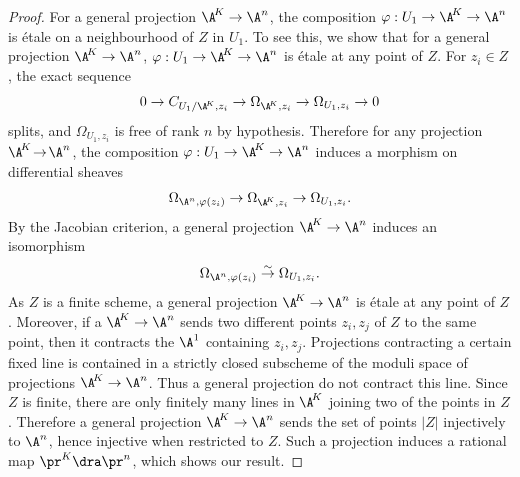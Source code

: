 \begin{proof}
For a general projection $\A^{\!K}\to \A^n$, the composition $\varphi: U_1\to \A^{\!K}\to \A^n$ is étale on a neighbourhood of $Z$ in $U_1$. To see this, we show that for a general projection $\A^{\!K}\to \A^n$, $\varphi: U_1\to \A^{\!K}\to \A^n$ is étale at any point of $Z$. For $z_i\in Z$, the exact sequence
\[
0 \to C_{U_1/\A^{\!K},z_i} \to \Omega_{\A^{\!K}, z_i} \to \Omega_{U_1,z_i}\to 0
\]
splits, and $ \Omega_{U_1,z_i}$ is free of rank $n$ by hypothesis. Therefore for any projection $\A^{\!K}\!\to\!\A^n$, the composition $\varphi: U_1\to \A^{\!K}\to \A^n$ induces a morphism on differential sheaves
\[
\Omega_{\A^n, \varphi(z_i)} \to \Omega_{\A^{\!K}, z_i}\to \Omega_{U_1, z_i}.
\]
By the Jacobian criterion, a general projection $\A^{\!K}\to \A^n$ induces an isomorphism
\[
\Omega_{\A^n, \varphi(z_i)} \stackrel{\sim}\to \Omega_{U_1, z_i}.
\]
As $Z$ is a finite scheme, a general projection $\A^{\!K}\to \A^n$ is étale at any point of $Z$. Moreover, if a $\A^{\!K}\to \A^n$ sends two different points $z_i, z_j$ of $Z$ to the same point, then it contracts the $\A^1$ containing $z_i,z_j$. Projections contracting a certain fixed line is contained in a strictly closed subscheme of the moduli space of projections $\A^{\!K}\to \A^n$. Thus a general projection do not contract this line. Since $Z$ is finite, there are only finitely many lines in $\A^{\!K}$ joining two of the points in $Z$. Therefore a general projection $\A^{\!K}\to \A^n$ sends the set of points $|Z|$ injectively to $\A^n$, hence injective when restricted to $Z$. Such a projection induces a rational map $\pr^K \dra \pr^n$, which shows our result.
\end{proof}

